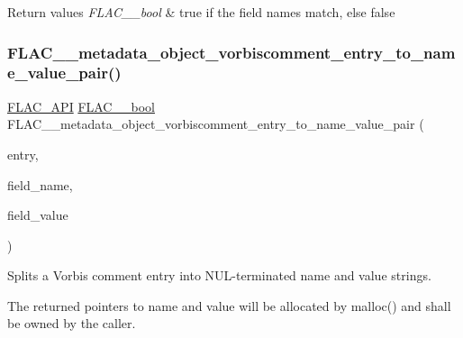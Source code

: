 \begin{DoxyRetVals}{Return values}
{\em F\+L\+A\+C\+\_\+\+\_\+bool} & {\ttfamily true} if the field names match, else {\ttfamily false} \\
\hline
\end{DoxyRetVals}
\mbox{\label{group__flac__metadata__object_gaca557b35c7c1ac19e30794bcf529746b}} 
\subsubsection{\texorpdfstring{FLAC\_\_metadata\_object\_vorbiscomment\_entry\_to\_name\_value\_pair()}{FLAC\_\_metadata\_object\_vorbiscomment\_entry\_to\_name\_value\_pair()}}
{\footnotesize\ttfamily \mbox{\hyperlink{group__flac__export_ga56ca07df8a23310707732b1c0007d6f5}{F\+L\+A\+C\+\_\+\+A\+PI}} \mbox{\hyperlink{ordinals_8h_a95103469f1cbd78b8cf250194985b34e}{F\+L\+A\+C\+\_\+\+\_\+bool}} F\+L\+A\+C\+\_\+\+\_\+metadata\+\_\+object\+\_\+vorbiscomment\+\_\+entry\+\_\+to\+\_\+name\+\_\+value\+\_\+pair (\begin{DoxyParamCaption}\item[{const \mbox{\hyperlink{struct_f_l_a_c_____stream_metadata___vorbis_comment___entry}{F\+L\+A\+C\+\_\+\+\_\+\+Stream\+Metadata\+\_\+\+Vorbis\+Comment\+\_\+\+Entry}}}]{entry,  }\item[{char $\ast$$\ast$}]{field\+\_\+name,  }\item[{char $\ast$$\ast$}]{field\+\_\+value }\end{DoxyParamCaption})}

Splits a Vorbis comment entry into N\+U\+L-\/terminated name and value strings.

The returned pointers to name and value will be allocated by malloc() and shall be owned by the caller.


